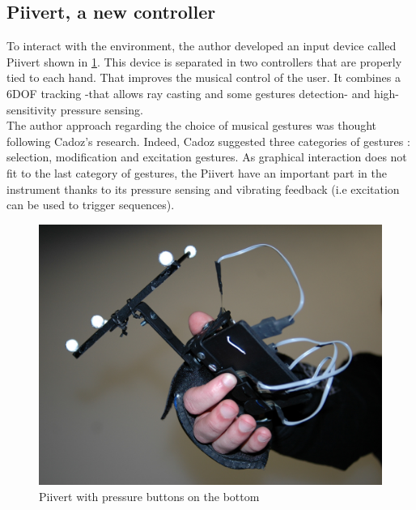 \subsection{Piivert, a new controller}

To interact with the environment, the author developed an input device called Piivert \cite{berthaut2010piivert} shown in \ref{fig:piivert}. This device is separated in two controllers that are properly tied to each hand. That improves the musical control of the user. It combines a 6DOF tracking -that allows ray casting and some gestures detection- and high-sensitivity pressure sensing.\\
The author approach regarding the choice of musical gestures was thought following Cadoz's \cite{cadoz1999musique} research. Indeed, Cadoz suggested three categories of gestures : selection, modification and excitation gestures. As graphical interaction does not fit to the last category of gestures, the Piivert have an important part in the instrument thanks to its pressure sensing and vibrating feedback (i.e excitation can be used to trigger sequences).

\begin{figure}[h!]
\centering\includegraphics[scale=0.2]{image/piivert.jpg}
\caption{Piivert with pressure buttons on the bottom}
\label{fig:piivert}
\end{figure} 